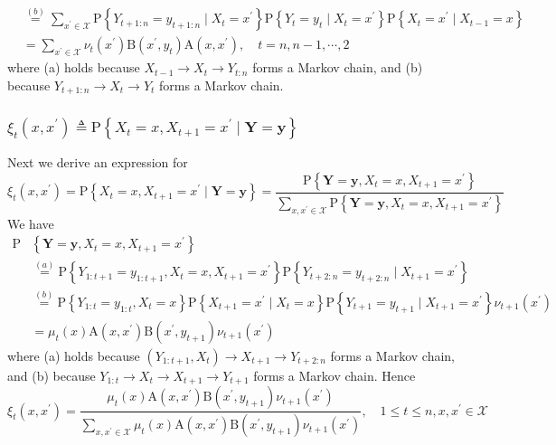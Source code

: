 \documentclass[11pt,a4paper]{article}
\begin{document}
\begin{enumerate}[(1)]
$$\begin{aligned}
    & \stackrel{(b)}{=} \sum_{x^{\prime} \in \mathcal{X}} \mathrm{P}\left\{Y_{t+1: n}=y_{t+1: n} \mid X_t=x^{\prime}\right\} \mathrm{P}\left\{Y_t=y_t \mid X_t=x^{\prime}\right\} \mathrm{P}\left\{X_t=x^{\prime} \mid X_{t-1}=x\right\} \\
    &=\sum_{x^{\prime} \in \mathcal{X}} \nu_t\left(x^{\prime}\right) \mathrm{B}\left(x^{\prime}, y_t\right) \mathrm{A}\left(x, x^{\prime}\right), \quad t=n, n-1, \cdots, 2
    \end{aligned}
    $$
    where (a) holds because $X_{t-1} \rightarrow X_{t} \rightarrow Y_{t:n}$ forms a Markov chain, and (b) because $Y_{t+1: n} \rightarrow X_t \rightarrow Y_t$ forms a Markov chain.
\end{enumerate}

\subsubsection{$\xi_t\left(x, x^{\prime}\right) \triangleq \mathrm{P}\left\{X_t=x, X_{t+1}=x^{\prime} \mid \boldsymbol{Y}=\boldsymbol{y}\right\}$}
Next we derive an expression for
$$
\xi_t\left(x, x^{\prime}\right)=\mathrm{P}\left\{X_t=x, X_{t+1}=x^{\prime} \mid \boldsymbol{Y}=\boldsymbol{y}\right\}=\frac{\mathrm{P}\left\{\boldsymbol{Y}=\boldsymbol{y}, X_t=x, X_{t+1}=x^{\prime}\right\}}{\sum_{x, x^{\prime} \in \mathcal{X}} \mathrm{P}\left\{\boldsymbol{Y}=\boldsymbol{y}, X_t=x, X_{t+1}=x^{\prime}\right\}}
$$
We have
\begin{equation}
    \begin{aligned}
        \mathrm{P}&\left\{\boldsymbol{Y}=\boldsymbol{y}, X_t=x, X_{t+1}=x^{\prime}\right\}\\
        &\stackrel{(a)}{=} \mathrm{P}\left\{Y_{1: t+1}=y_{1: t+1}, X_t=x, X_{t+1}=x^{\prime}\right\} \mathrm{P}\left\{Y_{t+2: n}=y_{t+2: n} \mid X_{t+1}=x^{\prime}\right\}\\
        &\stackrel{(b)}{=} \mathrm{P}\left\{Y_{1: t}=y_{1: t}, X_t=x\right\} \mathrm{P}\left\{X_{t+1}=x^{\prime} \mid X_t=x\right\} \mathrm{P}\left\{Y_{t+1}=y_{t+1} \mid X_{t+1}=x^{\prime}\right\} \nu_{t+1}\left(x^{\prime}\right)\\
        &=\mu_t(x) \mathrm{A}\left(x, x^{\prime}\right) \mathrm{B}\left(x^{\prime}, y_{t+1}\right) \nu_{t+1}\left(x^{\prime}\right)
    \end{aligned}
    \nonumber
\end{equation}
where (a) holds because $\left(Y_{1: t+1}, X_t\right) \rightarrow X_{t+1} \rightarrow Y_{t+2: n}$ forms a Markov chain, and (b) because $Y_{1: t} \rightarrow X_t \rightarrow X_{t+1} \rightarrow Y_{t+1}$ forms a Markov chain. Hence
$$
\xi_t\left(x, x^{\prime}\right)=\frac{\mu_t(x) \mathrm{A}\left(x, x^{\prime}\right) \mathrm{B}\left(x^{\prime}, y_{t+1}\right) \nu_{t+1}\left(x^{\prime}\right)}{\sum_{x, x^{\prime} \in \mathcal{X}} \mu_t(x) \mathrm{A}\left(x, x^{\prime}\right) \mathrm{B}\left(x^{\prime}, y_{t+1}\right) \nu_{t+1}\left(x^{\prime}\right)}, \quad 1 \leq t \leq n, x, x^{\prime} \in \mathcal{X}
$$
\end{document}
